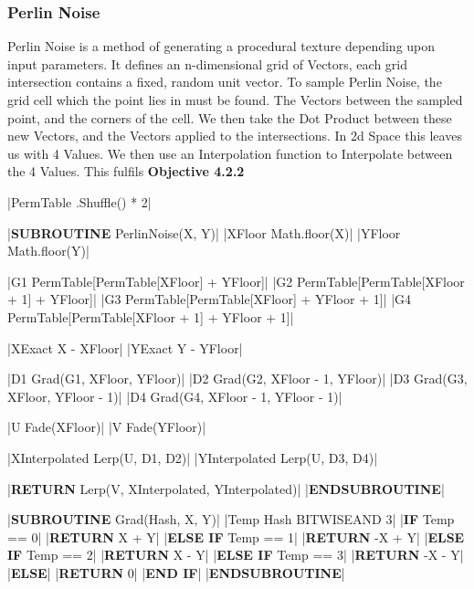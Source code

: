 \begin{flushleft}
                \vspace{0.5cm}
            \subsubsection{Perlin Noise}
                Perlin Noise is a method of generating a procedural texture depending upon input parameters. It defines an n-dimensional
                grid of Vectors, each grid intersection contains a fixed, random unit vector. To sample Perlin Noise, the grid cell which
                the point lies in must be found. The Vectors between the sampled point, and the corners of the cell. We then take the Dot
                Product between these new Vectors, and the Vectors applied to the intersections. In 2d Space this leaves us with 4 Values.
                We then use an Interpolation function to Interpolate between the 4 Values. This fulfils \textbf{Objective 4.2.2}
            
                \vspace{0.2cm}
                \begin{pseudocode}
|PermTable \leftarrow [1 \rightarrow 255].Shuffle() * 2|

|\textbf{SUBROUTINE} PerlinNoise(X, Y)|
    |XFloor \leftarrow Math.floor(X)|
    |YFloor \leftarrow Math.floor(Y)|

    |G1 \leftarrow PermTable[PermTable[XFloor] + YFloor]|
    |G2 \leftarrow PermTable[PermTable[XFloor + 1] + YFloor]|
    |G3 \leftarrow PermTable[PermTable[XFloor] + YFloor + 1]|
    |G4 \leftarrow PermTable[PermTable[XFloor + 1] + YFloor + 1]|

    |XExact \leftarrow X - XFloor|
    |YExact \leftarrow Y - YFloor|

    |D1 \leftarrow Grad(G1, XFloor, YFloor)|
    |D2 \leftarrow Grad(G2, XFloor - 1, YFloor)|
    |D3 \leftarrow Grad(G3, XFloor, YFloor - 1)|
    |D4 \leftarrow Grad(G4, XFloor - 1, YFloor - 1)|

    |U \leftarrow Fade(XFloor)|
    |V \leftarrow Fade(YFloor)|

    |XInterpolated \leftarrow Lerp(U, D1, D2)|
    |YInterpolated \leftarrow Lerp(U, D3, D4)|

    |\textbf{RETURN} Lerp(V, XInterpolated, YInterpolated)|
|\textbf{ENDSUBROUTINE}|

|\textbf{SUBROUTINE} Grad(Hash, X, Y)|
    |Temp \leftarrow Hash BITWISEAND 3|
    |\textbf{IF} Temp == 0|
        |\textbf{RETURN} X + Y|
    |\textbf{ELSE IF} Temp == 1|
        |\textbf{RETURN} -X + Y|
    |\textbf{ELSE IF} Temp == 2|
        |\textbf{RETURN} X - Y|
    |\textbf{ELSE IF} Temp == 3|
        |\textbf{RETURN} -X - Y|
    |\textbf{ELSE}|
        |\textbf{RETURN} 0|
    |\textbf{END IF}|
|\textbf{ENDSUBROUTINE}|


\end{pseudocode}
\end{flushleft}
